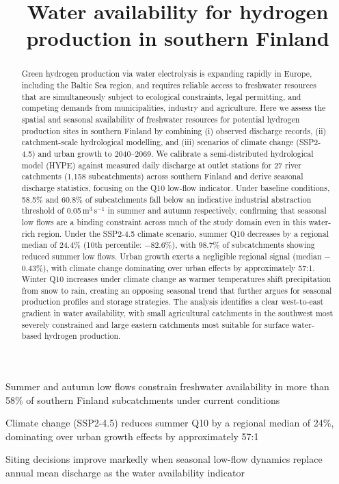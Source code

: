 \documentclass[draft]{agujournal2019}
\begin{document}
\graphicspath{{../}{../figures_manuscript/}}

\title{Water availability for hydrogen production in southern Finland}




\begin{keypoints}
\item Summer and autumn low flows constrain freshwater availability in more than 58\% of southern Finland subcatchments under current conditions
\item Climate change (SSP2-4.5) reduces summer Q10 by a regional median of 24\%, dominating over urban growth effects by approximately 57:1
\item Siting decisions improve markedly when seasonal low-flow dynamics replace annual mean discharge as the water availability indicator
\end{keypoints}

\begin{abstract}
Green hydrogen production via water electrolysis is expanding rapidly in Europe, including the Baltic Sea region, and requires reliable access to freshwater resources that are simultaneously subject to ecological constraints, legal permitting, and competing demands from municipalities, industry and agriculture. Here we assess the spatial and seasonal availability of freshwater resources for potential hydrogen production sites in southern Finland by combining (i) observed discharge records, (ii) catchment-scale hydrological modelling, and (iii) scenarios of climate change (SSP2-4.5) and urban growth to 2040--2069. We calibrate a semi-distributed hydrological model (HYPE) against measured daily discharge at outlet stations for 27 river catchments (1,158 subcatchments) across southern Finland and derive seasonal discharge statistics, focusing on the Q10 low-flow indicator. Under baseline conditions, 58.5\% and 60.8\% of subcatchments fall below an indicative industrial abstraction threshold of 0.05\,m$^3$\,s$^{-1}$ in summer and autumn respectively, confirming that seasonal low flows are a binding constraint across much of the study domain even in this water-rich region. Under the SSP2-4.5 climate scenario, summer Q10 decreases by a regional median of 24.4\% (10th percentile: $-$82.6\%), with 98.7\% of subcatchments showing reduced summer low flows. Urban growth exerts a negligible regional signal (median $-$0.43\%), with climate change dominating over urban effects by approximately 57:1. Winter Q10 increases under climate change as warmer temperatures shift precipitation from snow to rain, creating an opposing seasonal trend that further argues for seasonal production profiles and storage strategies. The analysis identifies a clear west-to-east gradient in water availability, with small agricultural catchments in the southwest most severely constrained and large eastern catchments most suitable for surface water-based hydrogen production.
\end{abstract}
\end{document}
